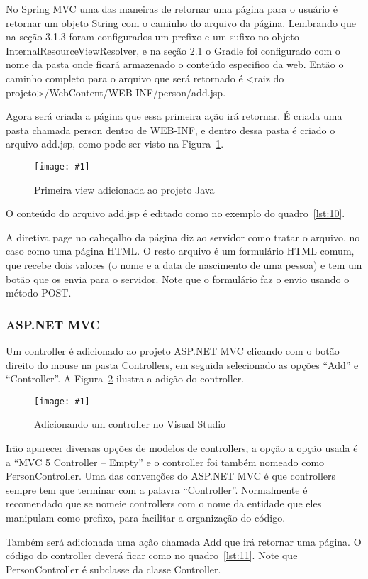 \documentclass[a4paper,12pt]{article}
\newcommand{\figura}[3] {
	\begin{figure}[ht]
		\centering
		\texttt{[image: \#1]}
		\caption{#2}
		\label{#3}
	\end{figure}
	\FloatBarrier
}
\newcommand{\jspcode}[3] {
	
	\FloatBarrier
}
\begin{document}
No Spring MVC uma das maneiras de retornar uma página para o usuário é retornar um objeto String com o caminho do arquivo da página. Lembrando que na seção 3.1.3 foram configurados um prefixo e um sufixo no objeto InternalResourceViewResolver, e na seção 2.1 o Gradle foi configurado com o nome da pasta onde ficará armazenado o conteúdo especifico da web. Então o caminho completo para o arquivo que será retornado é <raiz do projeto>/WebContent/WEB-INF/person/add.jsp.

Agora será criada a página que essa primeira ação irá retornar. É criada uma pasta chamada person dentro de WEB-INF, e dentro dessa pasta é criado o arquivo add.jsp, como pode ser visto na Figura~\ref{fig:24}.

\figura{24.png}{Primeira view adicionada ao projeto Java}{fig:24}

O conteúdo do arquivo add.jsp é editado como no exemplo do quadro~\ref{lst:10}.

\jspcode{code/10.txt}{Arquivo add.jsp}{lst:10}

A diretiva page no cabeçalho da página diz ao servidor como tratar o arquivo, no caso como uma página HTML. O resto arquivo é um formulário HTML comum, que recebe dois valores (o nome e a data de nascimento de uma pessoa) e tem um botão que os envia para o servidor. Note que o formulário faz o envio usando o método POST.

\subsubsection{ASP.NET MVC}

Um controller é adicionado ao projeto ASP.NET MVC clicando com o botão direito do mouse na pasta Controllers, em seguida selecionado as opções “Add” e “Controller”. A Figura~\ref{fig:25} ilustra a adição do controller.

\figura{25.png}{Adicionando um controller no Visual Studio}{fig:25}

Irão aparecer diversas opções de modelos de controllers, a opção a opção usada é a “MVC 5 Controller – Empty” e o controller foi também nomeado como PersonController. Uma das convenções do ASP.NET MVC é que controllers sempre tem que terminar com a palavra “Controller”. Normalmente é recomendado que se nomeie controllers com o nome da entidade que eles manipulam como prefixo, para facilitar a organização do código.

Também será adicionada uma ação chamada Add que irá retornar uma página. O código do controller deverá ficar como no quadro~\ref{lst:11}. Note que PersonController é subclasse da classe Controller.
\end{document}
